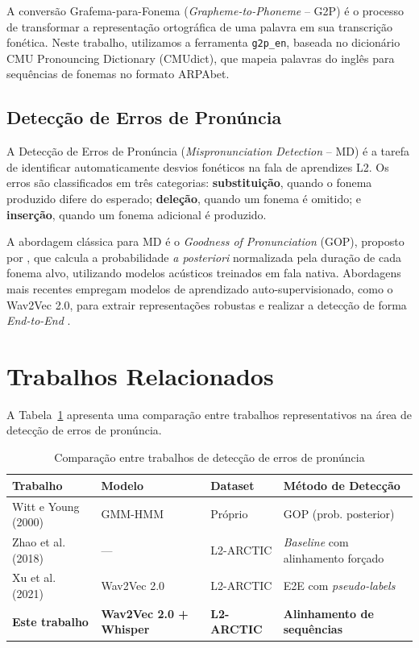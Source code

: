 \documentclass[12pt]{article}
\begin{document}
A conversão Grafema-para-Fonema (\textit{Grapheme-to-Phoneme} -- G2P) é o processo de transformar a representação ortográfica de uma palavra em sua transcrição fonética. Neste trabalho, utilizamos a ferramenta \texttt{g2p\_en}, baseada no dicionário CMU Pronouncing Dictionary (CMUdict), que mapeia palavras do inglês para sequências de fonemas no formato ARPAbet.

\subsection{Detecção de Erros de Pronúncia}

A Detecção de Erros de Pronúncia (\textit{Mispronunciation Detection} -- MD) é a tarefa de identificar automaticamente desvios fonéticos na fala de aprendizes L2. Os erros são classificados em três categorias: \textbf{substituição}, quando o fonema produzido difere do esperado; \textbf{deleção}, quando um fonema é omitido; e \textbf{inserção}, quando um fonema adicional é produzido.

A abordagem clássica para MD é o \textit{Goodness of Pronunciation} (GOP), proposto por \cite{witt2000}, que calcula a probabilidade \textit{a posteriori} normalizada pela duração de cada fonema alvo, utilizando modelos acústicos treinados em fala nativa. Abordagens mais recentes empregam modelos de aprendizado auto-supervisionado, como o Wav2Vec 2.0, para extrair representações robustas e realizar a detecção de forma \textit{End-to-End} \cite{xu2021}.


\section{Trabalhos Relacionados} \label{sec:relacionados}

A Tabela~\ref{tab:relacionados} apresenta uma comparação entre trabalhos representativos na área de detecção de erros de pronúncia.

\begin{table}[H]
\centering
\caption{Comparação entre trabalhos de detecção de erros de pronúncia}
\label{tab:relacionados}
\begin{tabular}{@{}p{3.2cm}p{2.5cm}p{2.2cm}p{3.5cm}@{}}
\toprule
\textbf{Trabalho} & \textbf{Modelo} & \textbf{Dataset} & \textbf{Método de Detecção} \\
\midrule
Witt e Young (2000) & GMM-HMM & Próprio & GOP (prob. posterior) \\
Zhao et al. (2018) & --- & L2-ARCTIC & \textit{Baseline} com alinhamento forçado \\
Xu et al. (2021) & Wav2Vec 2.0 & L2-ARCTIC & E2E com \textit{pseudo-labels} \\
\textbf{Este trabalho} & \textbf{Wav2Vec 2.0 + Whisper} & \textbf{L2-ARCTIC} & \textbf{Alinhamento de sequências} \\
\bottomrule
\end{tabular}
\end{table}
\end{document}
